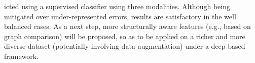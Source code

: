 \documentclass[conference]{IEEEtran}
\begin{document}
icted using a supervised classifier using three modalities. Although being mitigated over under-represented errors, results are satisfactory in the well balanced cases. As a next step, more structurally aware features (e.g., based on graph comparison) will be proposed, so as to be applied on a richer and more diverse dataset (potentially involving data augmentation) under a deep-based framework.



\end{document}
